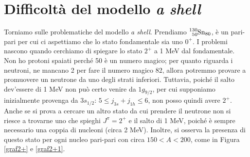 \section{Difficoltà del modello \textit{a shell}}
Torniamo sulle problematiche del modello \textit{a shell}. Prendiamo $\ce{^{130}_{50}Sn_{80}}$, è un pari-pari per cui ci aspettiamo che lo stato fondamentale sia uno $0^+$. I problemi nascono quando cerchiamo di spiegare lo stato $2^+$ a 1 MeV dal fondamentale. Non ho protoni spaiati perché 50 è un numero magico; per quanto riguarda i neutroni, ne mancano 2 per fare il numero magico 82, allora potremmo provare a promuovere un neutrone da uno degli strati inferiori. Tuttavia, poiché il salto dev'essere di 1 MeV non può certo venire da $1g_{9/2}$, per cui supponiamo inizialmente provenga da $3s_{1/2}$: $5\leq j_{3s} + j_{1h}\leq6$, non posso quindi avere $2^+$. Anche se si prova a cercare un altro stato da cui prendere il neutrone non si riesce a trovarne uno che spieghi $J^\pi=2^+$ e il salto di 1 MeV, poiché è sempre necessario  una coppia di nucleoni (circa 2 MeV). Inoltre, si osserva la presenza di questo stato per ogni nucleo pari-pari con circa $150<A<200$, come in Figura \ref{graf2+} e \ref{graf2+1}.

